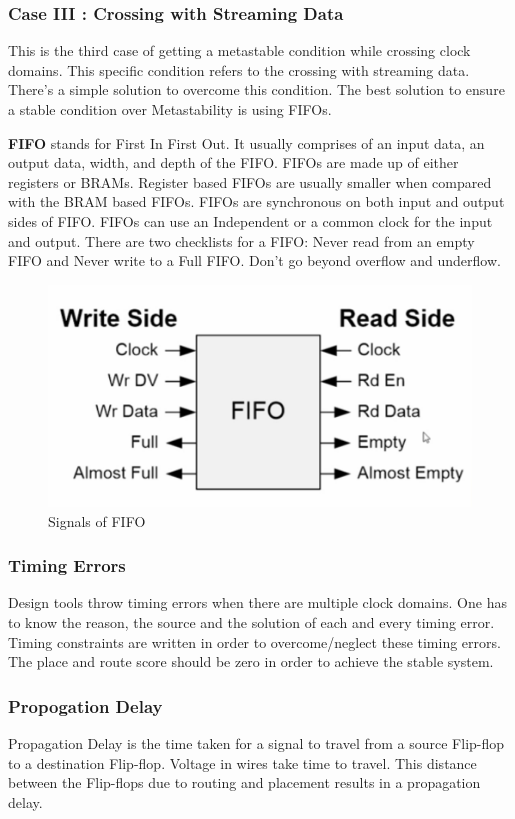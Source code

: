 \subsubsection{Case III : Crossing with Streaming Data}
This is the third case of getting a metastable condition while crossing clock domains. This specific condition refers to the crossing with streaming data. There's a simple solution to overcome this condition. The best solution to ensure a stable condition over Metastability is using FIFOs.

\par \textbf{FIFO} stands for First In First Out. It usually comprises of an input data, an output data, width, and depth of the FIFO. FIFOs are made up of either registers or BRAMs. Register based FIFOs are usually smaller when compared with the BRAM based FIFOs. FIFOs are synchronous on both input and output sides of FIFO. FIFOs can use an Independent or a common clock for the input and output. There are two checklists for a FIFO: Never read from an empty FIFO and Never write to a Full FIFO. Don't go beyond overflow and underflow. 


\begin{figure}[H]
	\begin{center}
		\includegraphics[width=5in]{images/FIFO.png}
		\caption{Signals of FIFO}
		\label{FIFO}
	\end{center}
\end{figure}

\subsubsection{Timing Errors}
Design tools throw timing errors when there are multiple clock domains. One has to know the reason, the source and the solution of each and every timing error. Timing constraints are written in order to overcome/neglect these timing errors. The place and route score should be zero in order to achieve the stable system.

\subsubsection{Propogation Delay}
Propagation Delay is the time taken for a signal to travel from a source Flip-flop to a destination Flip-flop. Voltage in wires take time to travel. This distance between the Flip-flops due to routing and placement results in a propagation delay.

